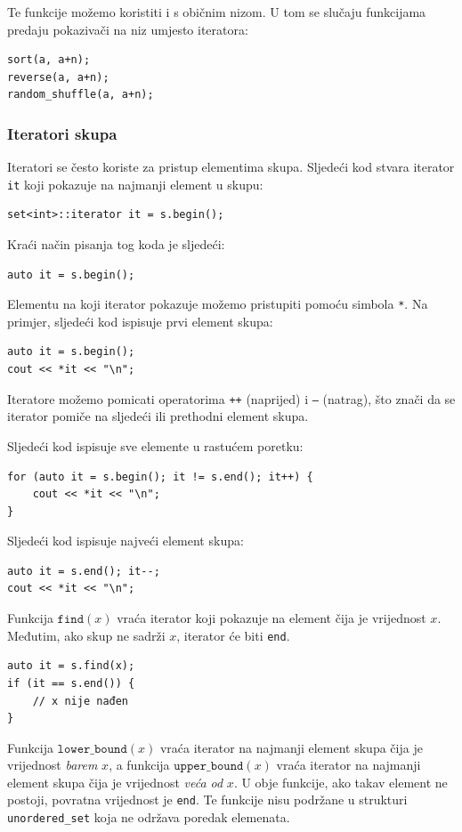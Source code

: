 Te funkcije možemo koristiti i s običnim nizom.
U tom se slučaju funkcijama predaju pokazivači na niz
umjesto iteratora:

\newpage
\begin{lstlisting}
sort(a, a+n);
reverse(a, a+n);
random_shuffle(a, a+n);
\end{lstlisting}

\subsubsection{Iteratori skupa}

Iteratori se često koriste za pristup
elementima skupa.
Sljedeći kod stvara iterator
\texttt{it} koji pokazuje na najmanji element u skupu:
\begin{lstlisting}
set<int>::iterator it = s.begin();
\end{lstlisting}
Kraći način pisanja tog koda je sljedeći:
\begin{lstlisting}
auto it = s.begin();
\end{lstlisting}
Elementu na koji iterator pokazuje
možemo pristupiti pomoću simbola \texttt{*}.
Na primjer, sljedeći kod ispisuje
prvi element skupa:

\begin{lstlisting}
auto it = s.begin();
cout << *it << "\n";
\end{lstlisting}

Iteratore možemo pomicati operatorima
\texttt{++} (naprijed) i \texttt{--} (natrag),
što znači da se iterator pomiče na sljedeći
ili prethodni element skupa.

Sljedeći kod ispisuje sve elemente
u rastućem poretku:
\begin{lstlisting}
for (auto it = s.begin(); it != s.end(); it++) {
    cout << *it << "\n";
}
\end{lstlisting}
Sljedeći kod ispisuje najveći element skupa:
\begin{lstlisting}
auto it = s.end(); it--;
cout << *it << "\n";
\end{lstlisting}

Funkcija $\texttt{find}(x)$ vraća iterator
koji pokazuje na element čija je vrijednost $x$.
Međutim, ako skup ne sadrži $x$,
iterator će biti \texttt{end}.

\begin{lstlisting}
auto it = s.find(x);
if (it == s.end()) {
    // x nije nađen
}
\end{lstlisting}

Funkcija $\texttt{lower\_bound}(x)$ vraća
iterator na najmanji element skupa
čija je vrijednost \emph{barem} $x$, a
funkcija $\texttt{upper\_bound}(x)$
vraća iterator na najmanji element skupa
čija je vrijednost \emph{veća od} $x$.
U obje funkcije, ako takav element ne postoji,
povratna vrijednost je \texttt{end}.
Te funkcije nisu podržane u
strukturi \texttt{unordered\_set} koja
ne održava poredak elemenata.

